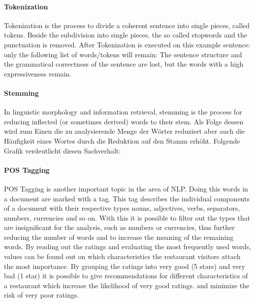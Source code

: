 \paragraph{Tokenization}
Tokenization is the process to divide a coherent sentence into single pieces, called tokens.
Beside the subdivision into single pieces, the so called stopwords and the punctuation is removed.
After Tokenization is executed on this example sentence:
\newline
{}
\newline
only the following list of words/tokens will remain:
\newline
{}
\newline
The sentence structure and the grammatical correctness of the sentence are lost, but the words with a high expressiveness remain.
\paragraph{Stemming}
In linguistic morphology and information retrieval, stemming is the process for reducing inflected (or sometimes derived) words to their stem.\cite{TextMiner14}
Als Folge dessen wird zum Einen die zu analysierende Menge der Wörter reduziert aber
auch die Häufigkeit eines Wortes durch die Reduktion auf den Stamm erhöht.
Folgende Grafik verdeutlicht diesen Sachverhalt:
\paragraph{\acs{POS} Tagging}
\ac{POS} Tagging is another important topic in the area of \ac{NLP}.
Doing this words in a document are marked with a tag.
This tag describes the individual components of a document with their respective types \eg{} nouns, adjectives, verbs, separators, numbers, currencies and so on.
With this it is possible to filter out the types that are insignificant for the analysis, such as numbers or currencies, thus further reducing the number of words and
to increase the meaning of the remaining words.
\newline
By reading out the ratings and evaluating the most frequently used words, values can be found out on which characteristics the restaurant visitors attach the most importance.
By grouping the ratings into very good (5 stars) and very bad (1 star) it is possible to give recommendations for different characteristics of a restaurant which increase the likelihood of very good ratings.
and minimize the risk of very poor ratings.
